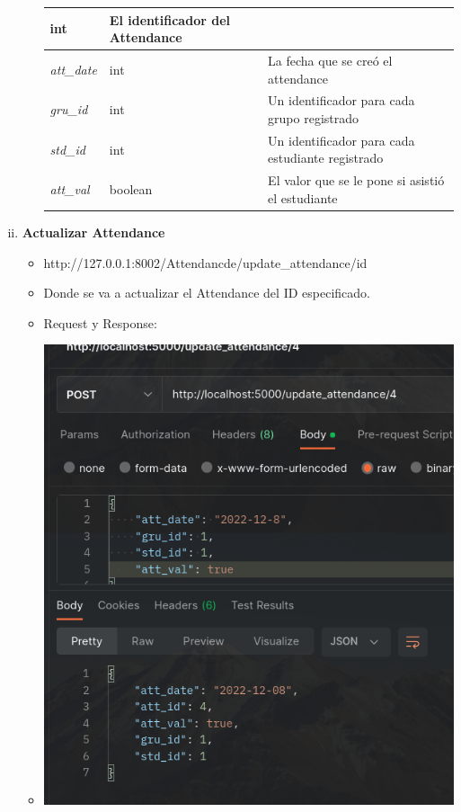 \documentclass{article}
\begin{document}
\begin{enumerate}[i.]
\begin{itemize}
\begin{table}[H]
\begin{tabular}{|l|l|l|}
        int & El identificador del Attendance \\ \hline \textit{att\_date} & int
        & La fecha que se creó el attendance \\ \hline \textit{gru\_id} & int &
        Un identificador para cada grupo registrado \\ \hline \textit{std\_id} &
        int & Un identificador para cada estudiante registrado \\ \hline
        \textit{att\_val} & boolean & El valor que se le pone si asistió el
        estudiante \\ \hline \end{tabular} \end{table}
    \end{itemize}

    \item \textbf{Actualizar Attendance}
    \begin{itemize}
        \item http://127.0.0.1:8002/Attendancde/update\_attendance/id
        \item Donde se va a actualizar el Attendance del ID especificado.
        \item Request y Response:
        \item \includegraphics[scale=.5]{assets/attendance/update.png}

\end{itemize}
\end{enumerate}
\end{document}
